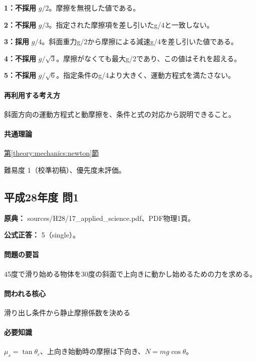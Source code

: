 \noindent\textbf{1：不採用} \(g/2\)。摩擦を無視した値である。\par

\noindent\textbf{2：不採用} \(g/3\)。指定された摩擦項を差し引いたg/4と一致しない。\par

\noindent\textbf{3：採用} \(g/4\)。斜面重力g/2から摩擦による減速g/4を差し引いた値である。\par

\noindent\textbf{4：不採用} \(g/\sqrt{3}\)。摩擦がなくても最大g/2であり、この値はそれを超える。\par

\noindent\textbf{5：不採用} \(g/\sqrt{6}\)。指定条件のg/4より大きく、運動方程式を満たさない。\par

\paragraph{再利用する考え方} 斜面方向の運動方程式と動摩擦を、条件と式の対応から説明できること。

\paragraph{共通理論} \hyperref[theory:mechanics:newton]{第\ref*{theory:mechanics:newton}節}

\par 難易度 1（校準初稿）、優先度未評価。

\subsection{平成28年度 問1}
\label{q:h28-reg-applied-01}

\noindent\textbf{原典：} sources/H28/17\_applied\_science.pdf、PDF物理1頁。

\textbf{公式正答：} 5（single）。

\paragraph{問題の要旨} 45度で滑り始める物体を30度の斜面で上向きに動かし始めるための力を求める。

\paragraph{問われる核心} 滑り出し条件から静止摩擦係数を決める

\paragraph{必要知識} \(\mu_s=\tan\theta_c\)、上向き始動時の摩擦は下向き、\(N=mg\cos\theta\)。

